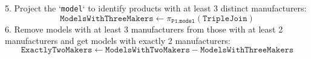 \documentclass{article}
\begin{document}
5. Project the `\texttt{model}` to identify products with at least 3 distinct manufacturers:
$$
    \texttt{ModelsWithThreeMakers} \leftarrow \pi_{\texttt{P1.model}}(\texttt{TripleJoin})
$$
6. Remove models with at least 3 manufacturers from those with at least 2 manufacturers and get models with exactly 2 manufacturers:
$$
    \texttt{ExactlyTwoMakers} \leftarrow \texttt{ModelsWithTwoMakers} - \texttt{ModelsWithThreeMakers}
$$
\end{document}
